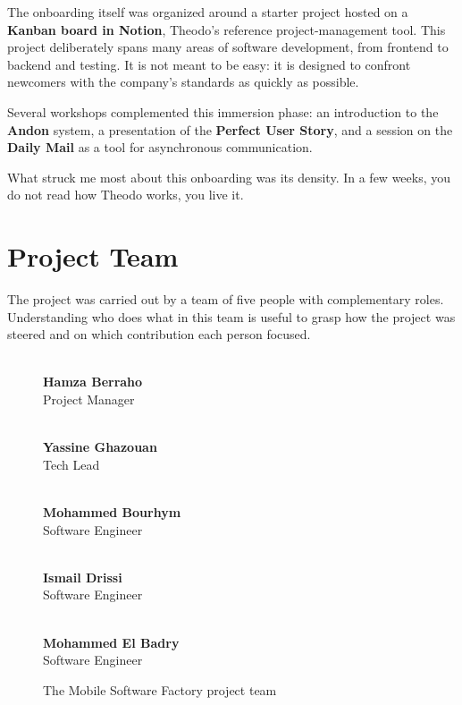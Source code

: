 The onboarding itself was organized around a starter project hosted on a \textbf{Kanban board in Notion}, Theodo's reference project-management tool. This project deliberately spans many areas of software development, from frontend to backend and testing. It is not meant to be easy: it is designed to confront newcomers with the company's standards as quickly as possible.

Several workshops complemented this immersion phase: an introduction to the \textbf{Andon} system, a presentation of the \textbf{Perfect User Story}, and a session on the \textbf{Daily Mail} as a tool for asynchronous communication.

What struck me most about this onboarding was its density. In a few weeks, you do not read how Theodo works, you live it.

\section{Project Team}

The project was carried out by a team of five people with complementary roles. Understanding who does what in this team is useful to grasp how the project was steered and on which contribution each person focused.

\begin{figure}[h]
\centering
\begin{minipage}[t]{0.19\textwidth}
	\centering
	\\[0.3em]
	{\small\textbf{Hamza Berraho}}\\
	{\fontsize{9pt}{11pt}\selectfont Project Manager}
\end{minipage}\hfill
\begin{minipage}[t]{0.19\textwidth}
	\centering
	\\[0.3em]
	{\small\textbf{Yassine Ghazouan}}\\
	{\fontsize{9pt}{11pt}\selectfont Tech Lead}
\end{minipage}\hfill
\begin{minipage}[t]{0.19\textwidth}
	\centering
	\\[0.3em]
	{\small\textbf{Mohammed Bourhym}}\\
	{\fontsize{9pt}{11pt}\selectfont Software Engineer}
\end{minipage}\hfill
\begin{minipage}[t]{0.19\textwidth}
	\centering
	\\[0.3em]
	{\small\textbf{Ismail Drissi}}\\
	{\fontsize{9pt}{11pt}\selectfont Software Engineer}
\end{minipage}\hfill
\begin{minipage}[t]{0.19\textwidth}
	\centering
	\\[0.3em]
	{\small\textbf{Mohammed El Badry}}\\
	{\fontsize{9pt}{11pt}\selectfont Software Engineer}
\end{minipage}
\caption{The Mobile Software Factory project team}
\end{figure}

